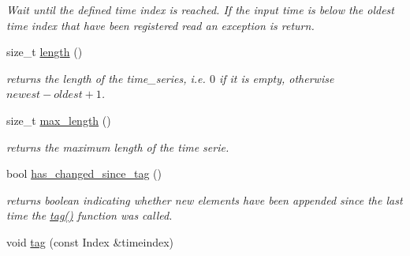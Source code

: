 \begin{DoxyCompactItemize}
\begin{DoxyCompactList}\small\item\em Wait until the defined time index is reached. If the input time is below the oldest time index that have been registered read an exception is return. \end{DoxyCompactList}\item 
size\+\_\+t \hyperlink{classtime__series_1_1internal_1_1TimeSeriesBase_ae6da9bd31ca06b30413f2073bc2e48e6}{length} ()\hypertarget{classtime__series_1_1internal_1_1TimeSeriesBase_ae6da9bd31ca06b30413f2073bc2e48e6}{}\label{classtime__series_1_1internal_1_1TimeSeriesBase_ae6da9bd31ca06b30413f2073bc2e48e6}

\begin{DoxyCompactList}\small\item\em returns the length of the time\+\_\+series, i.\+e. $0$ if it is empty, otherwise $newest - oldest +1 $. \end{DoxyCompactList}\item 
size\+\_\+t \hyperlink{classtime__series_1_1internal_1_1TimeSeriesBase_aee1bf636a094a3068f9de731688c3972}{max\+\_\+length} ()
\begin{DoxyCompactList}\small\item\em returns the maximum length of the time serie. \end{DoxyCompactList}\item 
bool \hyperlink{classtime__series_1_1internal_1_1TimeSeriesBase_a38511cb227e3e423922eaaea626a15ee}{has\+\_\+changed\+\_\+since\+\_\+tag} ()\hypertarget{classtime__series_1_1internal_1_1TimeSeriesBase_a38511cb227e3e423922eaaea626a15ee}{}\label{classtime__series_1_1internal_1_1TimeSeriesBase_a38511cb227e3e423922eaaea626a15ee}

\begin{DoxyCompactList}\small\item\em returns boolean indicating whether new elements have been appended since the last time the \hyperlink{classtime__series_1_1internal_1_1TimeSeriesBase_ad20c1f90dd2f9016f32132caa3f976f7}{tag()} function was called. \end{DoxyCompactList}\item 
void \hyperlink{classtime__series_1_1internal_1_1TimeSeriesBase_ad20c1f90dd2f9016f32132caa3f976f7}{tag} (const Index \&timeindex)\hypertarget{classtime__series_1_1internal_1_1TimeSeriesBase_ad20c1f90dd2f9016f32132caa3f976f7}{}\label{classtime__series_1_1internal_1_1TimeSeriesBase_ad20c1f90dd2f9016f32132caa3f976f7}


\end{DoxyCompactItemize}
